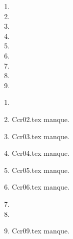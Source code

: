  
 
\begin{enumerate}
  \item  
  \item  
  \item  
  \item  
  \item  
  \item  
  \item  
  \item  
  \item  
\end{enumerate} 
\clearpage 
{}
\begin{enumerate}
  \item  
  \item Ccr02.tex manque. 
  \item Ccr03.tex manque. 
  \item Ccr04.tex manque. 
  \item Ccr05.tex manque. 
  \item Ccr06.tex manque. 
  \item  
  \item  
  \item Ccr09.tex manque. 
\end{enumerate} 
